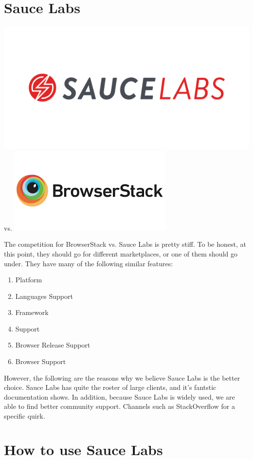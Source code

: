 \section{ Sauce Labs }
\includegraphics[scale=0.25]{pwa/pwa-toolset-sauce-labs/logo-sauce-labs}
vs.
\includegraphics[scale=0.4]{pwa/pwa-toolset-sauce-labs/logo-browserstack}

The competition for BrowserStack vs. Sauce Labs is pretty stiff. To be honest,
at this point, they should go for different marketplaces, or one of them should
go under. They have many of the following similar features:
\begin{enumerate}
  \item Platform
  \item Languages Support
  \item Framework
  \item Support
  \item Browser Release Support
  \item Browser Support
\end{enumerate}

However, the following are the reasons why we believe Sauce Labs is the better
choice. Sauce Labs has quite the roster of large clients, and it's fantstic
documentation shows. In addition, because Sauce Labs is widely used, we are able
to find better community support. Channels such as StackOverflow for a specific
quirk.

\section{ How to use Sauce Labs }
